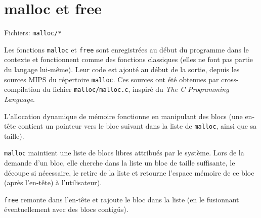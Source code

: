 \documentclass{article}
\begin{document}
	\section{malloc et free}
		\par Fichiers: \verb#malloc/*#
		\par Les fonctions \verb#malloc# et \verb#free# sont enregistrées au début du programme dans le contexte et fonctionnent comme des fonctions classiques (elles ne font pas partie du langage lui-même). Leur code est ajouté au début de la sortie, depuis les sources MIPS du répertoire \verb#malloc#. Ces sources ont été obtenues par cross-compilation du fichier \verb#malloc/malloc.c#, inspiré du \textit{The C Programming Language}.
		\par L'allocation dynamique de mémoire fonctionne en manipulant des blocs (une en-tête contient un pointeur vers le bloc suivant dans la liste de \verb#malloc#, ainsi que sa taille).
		\par \verb#malloc# maintient une liste de blocs libres attribués par le système. Lors de la demande d'un bloc, elle cherche dans la liste un bloc de taille suffisante, le découpe si nécessaire, le retire de la liste et retourne l'espace mémoire de ce bloc (après l'en-tête) à l'utilisateur).
		\par \verb#free# remonte dans l'en-tête et rajoute le bloc dans la liste (en le fusionnant éventuellement avec des blocs contigüs).
\end{document}
